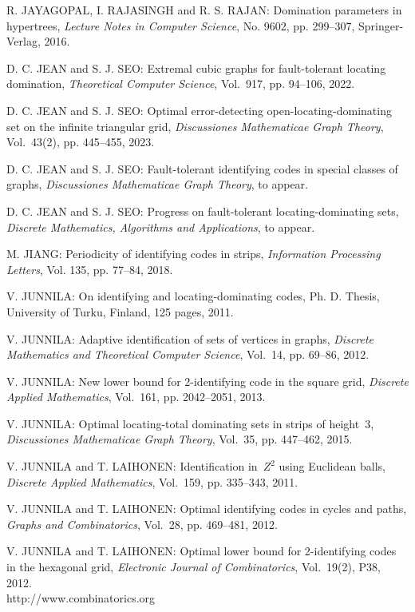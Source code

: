\begin{thebibliography}{999}
R. JAYAGOPAL, I. RAJASINGH and R. S. RAJAN: Domination parameters in hypertrees, {\it Lecture Notes in Computer Science}, No. 9602, pp. 299--307, Springer-Verlag, 2016.

D. C. JEAN and S. J. SEO: Extremal cubic graphs for fault-tolerant locating domination, {\it Theoretical Computer Science}, Vol.~917, pp. 94--106, 2022.

D. C. JEAN and S. J. SEO: Optimal error-detecting open-locating-dominating set on the infinite triangular grid, {\it Discussiones Mathematicae Graph Theory}, Vol.~43(2), pp. 445--455, 2023. 

D. C. JEAN and S. J. SEO: Fault-tolerant identifying codes in special classes of graphs, {\it Discussiones Mathematicae Graph Theory}, to appear.

D. C. JEAN and S. J. SEO: Progress on fault-tolerant locating-dominating sets, {\it Discrete Mathematics, Algorithms and Applications}, to appear.

M. JIANG: Periodicity of identifying codes in strips, {\it Information Processing Letters}, Vol. 135, pp. 77--84, 2018. 

V. JUNNILA: On identifying and locating-dominating codes, Ph. D. Thesis, University of Turku, Finland, 125 pages, 2011.

V. JUNNILA: Adaptive identification of sets of vertices in graphs, {\it Discrete Mathematics and Theoretical Computer Science}, Vol.~14, pp. 69--86, 2012.

V. JUNNILA: New lower bound for 2-identifying code in the square grid, {\it Discrete Applied Mathematics}, Vol.~161, pp. 2042--2051, 2013.

V. JUNNILA: Optimal locating-total dominating sets in strips of height~3, {\it Discussiones Mathematicae Graph Theory}, Vol.~35, pp. 447--462, 2015. 

V. JUNNILA and T. LAIHONEN: Identification in~$Z^2$ using Euclidean balls, {\it Discrete Applied Mathematics}, Vol.~159, pp. 335--343, 2011.
  
V. JUNNILA and T. LAIHONEN: Optimal identifying codes in cycles and paths, {\it Graphs and Combinatorics}, Vol.~28, pp. 469--481, 2012.

V. JUNNILA and T. LAIHONEN: Optimal lower bound for 2-identifying codes in the hexagonal grid, {\it Electronic Journal of Combinatorics}, Vol.~19(2), P38, 2012.\\
http://www.combinatorics.org


\end{thebibliography}

